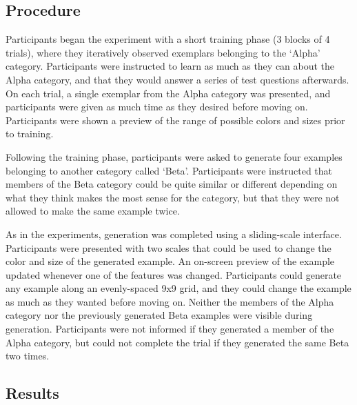 \documentclass[10pt,letterpaper]{article}
\begin{document}
\subsection{Procedure}

Participants began the experiment with a short training phase (3 blocks of 4 trials), where they iteratively observed exemplars belonging to the `Alpha' category. Participants were instructed to learn as much as they can about the Alpha category, and that they would answer a series of test questions afterwards. On each trial, a single exemplar from the Alpha category was presented, and participants were given as much time as they desired before moving on. Participants were shown a preview of the range of possible colors and sizes prior to training.

Following the training phase, participants were asked to generate four examples belonging to another category called `Beta'. Participants were instructed that members of the Beta category could be quite similar or different depending on what they think makes the most sense for the category, but that they were not allowed to make the same example twice. 

As in the \citet{jern2013probabilistic} experiments, generation was completed using a sliding-scale interface. Participants were presented with two scales that could be used to change the color and size of the generated example. An on-screen preview of the example updated whenever one of the features was changed. Participants could generate any example along an evenly-spaced 9x9 grid, and they could change the example as much as they wanted before moving on. Neither the members of the Alpha category nor the previously generated Beta examples were visible during generation. Participants were not informed if they generated a member of the Alpha category, but could not complete the trial if they generated the same Beta two times.



\subsection{Results}
\end{document}
